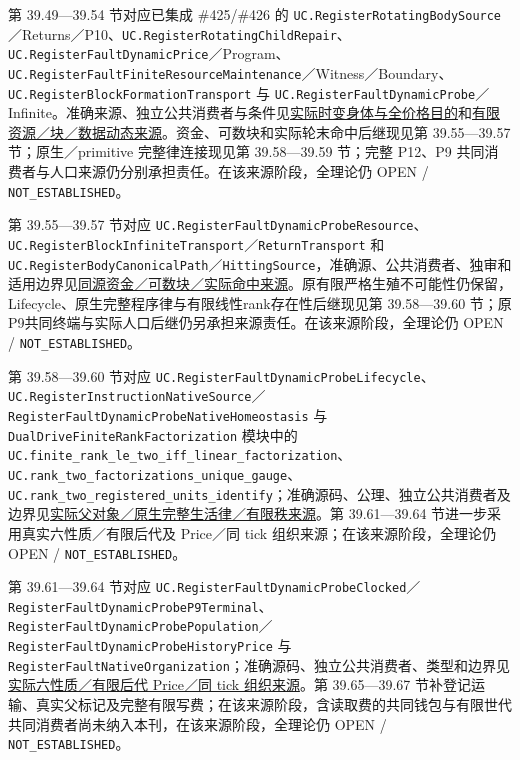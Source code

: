 \documentclass[
  11pt,
  oneside]{book}
\begin{document}
第 39.49---39.54 节对应已集成 \#425/\#426 的 \nolinkurl{UC.RegisterRotatingBodySource}／Returns／P10、\nolinkurl{UC.RegisterRotatingChildRepair}、\nolinkurl{UC.RegisterFaultDynamicPrice}／Program、\nolinkurl{UC.RegisterFaultFiniteResourceMaintenance}／Witness／Boundary、\nolinkurl{UC.RegisterBlockFormationTransport} 与 \nolinkurl{UC.RegisterFaultDynamicProbe}／Infinite。准确来源、独立公共消费者与条件见\href{../formalization/ueot-core/docs/compression/theory_completion/unified_closure/rotating_body_dynamic_price_source_v1/RESULTS_AND_OPEN_OBLIGATIONS.md}{实际时变身体与全价格目的}和\href{../formalization/ueot-core/docs/compression/theory_completion/unified_closure/resource_block_dynamic_data_source_v1/RESULTS_AND_OPEN_OBLIGATIONS.md}{有限资源／块／数据动态来源}。资金、可数块和实际轮末命中后继现见第 39.55---39.57 节；原生／primitive 完整律连接现见第 39.58---39.59 节；完整 P12、P9 共同消费者与人口来源仍分别承担责任。在该来源阶段，全理论仍 OPEN / \nolinkurl{NOT_ESTABLISHED}。

第 39.55---39.57 节对应 \nolinkurl{UC.RegisterFaultDynamicProbeResource}、\nolinkurl{UC.RegisterBlockInfiniteTransport}／\nolinkurl{ReturnTransport} 和 \nolinkurl{UC.RegisterBodyCanonicalPath}／\nolinkurl{HittingSource}，准确源、公共消费者、独审和适用边界见\href{../formalization/ueot-core/docs/compression/theory_completion/unified_closure/funded_countable_block_source_v1/RESULTS_AND_OPEN_OBLIGATIONS.md}{同源资金／可数块／实际命中来源}。原有限严格生殖不可能性仍保留，Lifecycle、原生完整程序律与有限线性rank存在性后继现见第 39.58---39.60 节；原P9共同终端与实际人口后继仍另承担来源责任。在该来源阶段，全理论仍 OPEN / \nolinkurl{NOT_ESTABLISHED}。

第 39.58---39.60 节对应 \nolinkurl{UC.RegisterFaultDynamicProbeLifecycle}、\nolinkurl{UC.RegisterInstructionNativeSource}／\nolinkurl{RegisterFaultDynamicProbeNativeHomeostasis} 与 \nolinkurl{DualDriveFiniteRankFactorization} 模块中的 \nolinkurl{UC.finite_rank_le_two_iff_linear_factorization}、\nolinkurl{UC.rank_two_factorizations_unique_gauge}、\nolinkurl{UC.rank_two_registered_units_identify}；准确源码、公理、独立公共消费者及边界见\href{../formalization/ueot-core/docs/compression/theory_completion/unified_closure/native_lifecycle_rank_source_v1/RESULTS_AND_OPEN_OBLIGATIONS.md}{实际父对象／原生完整生活律／有限秩来源}。第 39.61---39.64 节进一步采用真实六性质／有限后代及 Price／同 tick 组织来源；在该来源阶段，全理论仍 OPEN / \nolinkurl{NOT_ESTABLISHED}。

第 39.61---39.64 节对应 \nolinkurl{UC.RegisterFaultDynamicProbeClocked}／\nolinkurl{RegisterFaultDynamicProbeP9Terminal}、\nolinkurl{RegisterFaultDynamicProbePopulation}／\nolinkurl{RegisterFaultDynamicProbeHistoryPrice} 与 \nolinkurl{RegisterFaultNativeOrganization}；准确源码、独立公共消费者、类型和边界见\href{../formalization/ueot-core/docs/compression/theory_completion/unified_closure/p9_lineage_organization_source_v1/RESULTS_AND_OPEN_OBLIGATIONS.md}{实际六性质／有限后代 Price／同 tick 组织来源}。第 39.65---39.67 节补登记运输、真实父标记及完整有限写费；在该来源阶段，含读取费的共同钱包与有限世代共同消费者尚未纳入本刊，在该来源阶段，全理论仍 OPEN / \nolinkurl{NOT_ESTABLISHED}。
\end{document}
